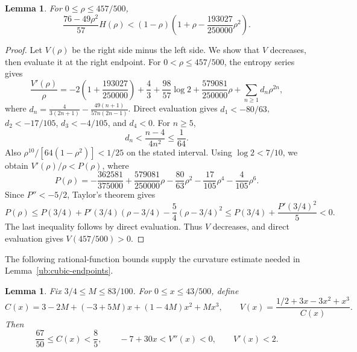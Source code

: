 \documentclass[11pt,letterpaper]{amsart}
\newcommand{\1}{\mathbf 1}
\newtheorem{lemma}[theorem]{Lemma}
\numberwithin{equation}{section}
\begin{document}
\begin{lemma}\label{app:central-energy}
For $0\le\rho\le457/500$,
\[
 \frac{76-49\rho^2}{57}H(\rho)
 <(1-\rho)\left(1+\rho-\frac{193027}{250000}\rho^2\right).
\]
\end{lemma}

\begin{proof}
Let $V(\rho)$ be the right side minus the left side.
We show that $V$ decreases, then evaluate it at the right endpoint.
For $0<\rho\le457/500$, the entropy series gives
\[
 \frac{V'(\rho)}{\rho}
 =-2\left(1+\frac{193027}{250000}\right)+\frac43
  +\frac{98}{57}\log2+\frac{579081}{250000}\rho
  +\sum_{n\ge1}d_n\rho^{2n},
\]
where
$d_n=\frac{4}{3(2n+1)}
      -\frac{49(n+1)}{57n(2n-1)}$.
Direct evaluation gives
$d_1<-80/63$, $d_2<-17/105$, $d_3<-4/105$, and $d_4<0$.
For $n\ge5$,
\[
 d_n<\frac{n-4}{4n^2}\le\frac1{64}.
\]
Also
$\rho^{10}/[64(1-\rho^2)]<1/25$
on the stated interval.
Using $\log2<7/10$, we obtain
$V'(\rho)/\rho<P(\rho)$, where
\[
 P(\rho)=-\frac{362581}{375000}
          +\frac{579081}{250000}\rho
          -\frac{80}{63}\rho^2-\frac{17}{105}\rho^4
          -\frac4{105}\rho^6.
\]
Since $P''<-5/2$, Taylor's theorem gives
\[
 P(\rho)\le P(3/4)+P'(3/4)(\rho-3/4)
                   -\frac54(\rho-3/4)^2
 \le P(3/4)+\frac{P'(3/4)^2}{5}<0.
\]
The last inequality follows by direct evaluation.
Thus $V$ decreases, and direct evaluation gives
$V(457/500)>0$.
\end{proof}

The following rational-function bounds supply the curvature
estimate needed in Lemma~\ref{ub:cubic-endpoints}.

\begin{lemma}\label{app:cubic-curvature}
Fix $3/4\le M\le83/100$.
For $0\le x\le43/500$, define
\[
 C(x)=3-2M+(-3+5M)x+(1-4M)x^2+Mx^3, \qquad V(x)=\frac{1/2+3x-3x^2+x^3}{C(x)}.
\]
Then
\[
 \frac{67}{50}\le C(x)<\frac85,\qquad
 -7+30x<V''(x)<0,\qquad V'(x)<2.
\]
\end{lemma}
\end{document}
